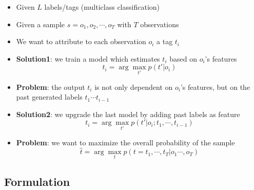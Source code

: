 \documentclass[xcolor=table]{beamer}
\begin{document}
\begin{frame}
	\frametitle{\insertshortsubtitle}
	\framesubtitle{\insertsection}
	
	\begin{itemize}
		\item Given $ L $ labels/tags (multiclass classification)
		\item Given a sample $ s = o_1, o_2, \cdots, o_T $ with $ T $ observations
		\item We want to attribute to each observation $ o_i $ a tag $ t_i $
		\item \textbf{Solution1}: we train a model which estimates $ t_i $ based on $ o_i $'s features
		\[t_i = \arg\max_{t'} p(t'|o_i)\]
		\item \textbf{Problem}: the output $ t_i $ is not only dependent on $ o_i $'s features, but on the past generated labels $ t_1 \cdots t_{i-1} $
		\item \textbf{Solution2}: we upgrade the last model by adding past labels as feature
		\[t_i = \arg\max_{t'} p(t'|o_i; t_1, \cdots, t_{i-1})\]
		\item \textbf{Problem}: we want to maximize the overall probability of the sample 
		\[\hat{t} = \arg\max_{t} p(t=t_1, \cdots, t_T|o_1\cdots, o_T)\]
	\end{itemize}
	
\end{frame}

\subsection{Formulation}
\end{document}
